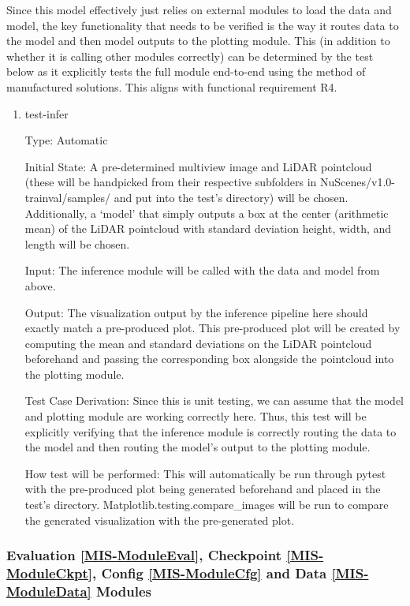 \documentclass[12pt, titlepage]{article}
\begin{document}
Since this model effectively just relies on external modules to load the data and model, the key functionality that needs 
to be verified is the way it routes data to the model and then model outputs to the plotting module. This (in addition to whether it is calling other modules correctly) 
can be determined by the test below as it explicitly tests the full module end-to-end using the method of manufactured solutions. This aligns with functional requirement R4.

\begin{enumerate}

  \item{test-infer\\}
  
  Type: Automatic
            
  Initial State: A pre-determined multiview image and LiDAR pointcloud (these will be handpicked from their respective subfolders in NuScenes/v1.0-trainval/samples/ and put into the test's directory) will be chosen. Additionally, 
a `model' that simply outputs a box at the center (arithmetic mean) of the LiDAR pointcloud with standard deviation height, width, and length will be chosen.  
            
  Input: The inference module will be called with the data and model from above. 
            
  Output: The visualization output by the inference pipeline here should exactly match a pre-produced plot. This pre-produced plot will be created by 
computing the mean and standard deviations on the LiDAR pointcloud beforehand and passing the corresponding box alongside the pointcloud into the plotting module.  
  
  Test Case Derivation: Since this is unit testing, we can assume that the model and plotting module are working correctly here. Thus, this test will be explicitly verifying 
that the inference module is correctly routing the data to the model and then routing the model's output to the plotting module.  
  
  How test will be performed: This will automatically be run through pytest with the pre-produced plot being generated beforehand and placed in the test's directory. Matplotlib.testing.compare\_images will be run to compare the generated visualization with the pre-generated plot.
      
  \end{enumerate}

\subsubsection{Evaluation \ref{MIS-ModuleEval}, Checkpoint \ref{MIS-ModuleCkpt}, Config \ref{MIS-ModuleCfg} and Data \ref{MIS-ModuleData} Modules}
\end{document}
